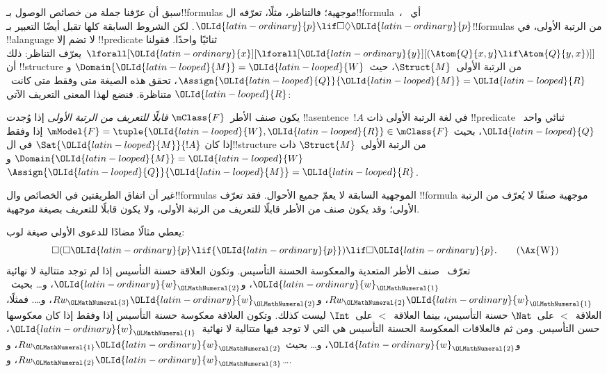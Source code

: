 \documentclass[../../../include/open-logic-section]{subfiles}
\begin{document}


سبق أن عرّفنا جملة من خصائص الوصول بـ!!{formula}s موجهية؛
فالتناظر، مثلًا، تعرّفه ال!!{formula}~، أي~${\OLId{latin-ordinary}{p}} \lif \Box\Diamond {\OLId{latin-ordinary}{p}}$.
لكن الشروط السابقة كلها تقبل أيضًا التعبير بـ!!{formula}s من
الرتبة الأولى، في !!a{language} لا تضم إلا !!{predicate} ثنائيًا
واحدًا. فقولنا
$\lforall[{\OLId{latin-ordinary}{x}}][\lforall[{\OLId{latin-ordinary}{y}}][(\Atom{Q}{x,y} \lif \Atom{Q}{y, x})]]$
يعرّف التناظر: ذلك أن !!{structure} من الرتبة الأولى~$\Struct{M}$،
حيث~$\Domain{{\OLId{latin-looped}{M}}} = {\OLId{latin-looped}{W}}$ و$\Assign{{\OLId{latin-looped}{Q}}}{{\OLId{latin-looped}{M}}} = {\OLId{latin-looped}{R}}$، تحقق هذه الصيغة
متى وفقط متى كانت~${\OLId{latin-looped}{R}}$ متناظرة. فنضع لهذا المعنى التعريف الآتي:

\begin{defn}
  يكون صنف الأطر~$\mClass{F}$ \emph{قابلًا للتعريف من الرتبة الأولى}
  إذا وُجدت !!a{sentence}~$!A$ في لغة الرتبة الأولى ذات
  !!{predicate} ثنائي واحد~${\OLId{latin-looped}{Q}}$، بحيث
  $\mModel{F} = \tuple{{\OLId{latin-looped}{W}}, {\OLId{latin-looped}{R}}} \in \mClass{F}$ إذا وفقط إذا كان
  $\Sat{{\OLId{latin-looped}{M}}}{!A}$ في ال!!{structure} من الرتبة الأولى~$\Struct{M}$ ذات
  $\Domain{{\OLId{latin-looped}{M}}} = {\OLId{latin-looped}{W}}$ و$\Assign{{\OLId{latin-looped}{Q}}}{{\OLId{latin-looped}{M}}} = {\OLId{latin-looped}{R}}$.
\end{defn}

غير أن اتفاق الطريقتين في الخصائص وال!!{formula}s الموجهية
السابقة لا يعمّ جميع الأحوال. فقد تعرّف !!{formula} موجهية صنفًا
لا يُعرّف من الرتبة الأولى؛ وقد يكون صنف من الأطر قابلًا للتعريف
من الرتبة الأولى، ولا يكون قابلًا للتعريف بصيغة موجهية.

يعطي مثالًا مضادًا للدعوى الأولى صيغة لوب:
\begin{equation}
\Box(\Box {\OLId{latin-ordinary}{p}} \lif {\OLId{latin-ordinary}{p}}) \lif \Box {\OLId{latin-ordinary}{p}}. \tag{\Ax{W}}
\end{equation}
تعرّف~ صنف الأطر المتعدية والمعكوسة الحسنة التأسيس. وتكون
العلاقة حسنة التأسيس إذا لم توجد متتالية لا نهائية
${\OLId{latin-ordinary}{w}}_{\OLMathNumeral{1}}$، و${\OLId{latin-ordinary}{w}}_{\OLMathNumeral{2}}$، و\dots{} بحيث~$Rw_{\OLMathNumeral{2}}{\OLId{latin-ordinary}{w}}_{\OLMathNumeral{1}}$، و$Rw_{\OLMathNumeral{3}}{\OLId{latin-ordinary}{w}}_{\OLMathNumeral{2}}$، و\dots. فمثلًا،
العلاقة~$<$ على~$\Nat$ حسنة التأسيس، بينما العلاقة~$<$ على~$\Int$
ليست كذلك. وتكون العلاقة معكوسة حسنة التأسيس إذا وفقط إذا كان
معكوسها حسن التأسيس. ومن ثم فالعلاقات المعكوسة الحسنة التأسيس هي التي
لا توجد فيها متتالية لا نهائية~${\OLId{latin-ordinary}{w}}_{\OLMathNumeral{1}}$، و${\OLId{latin-ordinary}{w}}_{\OLMathNumeral{2}}$، و\dots{} بحيث
$Rw_{\OLMathNumeral{1}}{\OLId{latin-ordinary}{w}}_{\OLMathNumeral{2}}$، و$Rw_{\OLMathNumeral{2}}{\OLId{latin-ordinary}{w}}_{\OLMathNumeral{3}}$، و\dots.
\end{document}
